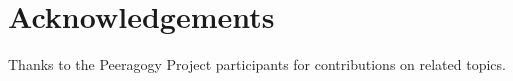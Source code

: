 \section{Acknowledgements}\label{sec:ack}
Thanks to the Peeragogy Project participants for contributions on related topics.

\renewcommand\bibname{References}
\renewcommand\refname{References}





